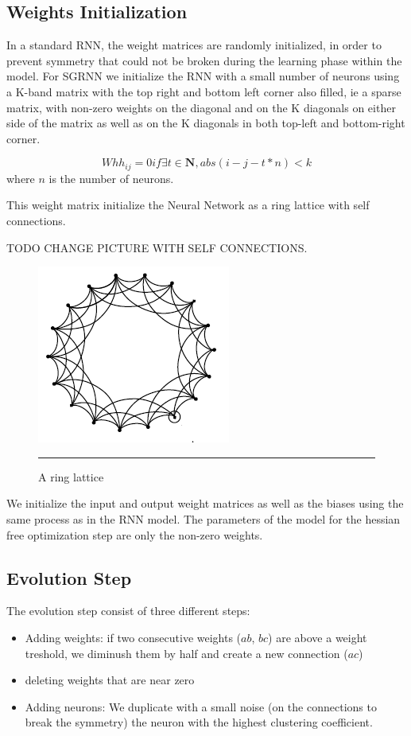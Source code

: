 \subsection{Weights Initialization}

    In a standard RNN, the weight matrices are randomly initialized, in order to prevent symmetry that could not be broken during the learning phase within the model. For SGRNN we initialize the RNN with a small number of neurons using a K-band matrix with the top right and bottom left corner also filled, ie a sparse matrix, with non-zero weights on the diagonal and on the K diagonals on either side of the matrix as well as on the K diagonals in both top-left and bottom-right corner.

$$Whh_{ij} = 0 if \exists t \in \mathbf{N}, abs(i - j - t * n) < k $$ where $n$ is the number of neurons.

This weight matrix initialize the Neural Network as a ring lattice with self connections. 

TODO CHANGE PICTURE WITH SELF CONNECTIONS.

\begin{figure}[htbp]
    \centering
    \includegraphics[scale=0.7]{Figures/ring_lattice.png}
    \rule{35em}{0.5pt}
    \caption[A ring lattice]{A ring lattice}
    \label{fig:ring_lattice}
\end{figure}

We initialize the input and output weight matrices as well as the biases using the same process as in the RNN model. 
The parameters of the model for the hessian free optimization step are only the non-zero weights. 

\subsection{Evolution Step}

The evolution step consist of three different steps:
\begin{itemize}
    \item Adding weights: if two consecutive weights ($ab$, $bc$) are above a weight treshold, we diminush them by half and create a new connection ($ac$)
    \item deleting weights that are near zero
    \item Adding neurons: We duplicate with a small noise (on the connections to break the symmetry) the neuron with the highest clustering coefficient. 
\end{itemize}


